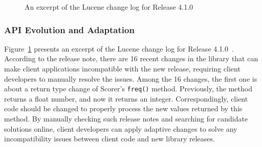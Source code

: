 \documentclass[runningheads,a4paper]{llncs}
\newcommand{\codefont}[1]{\footnotesize{\texttt{#1}}\normalsize}
\begin{document}
\begin{figure}
\centering
{}
\caption{An excerpt of the Lucene change log for Release 4.1.0~\cite{releasenote}}
\label{fig:releasenote}
\end{figure}

\subsubsection{API Evolution and Adaptation} 
\todo{} 
Figure~\ref{fig:releasenote} presents an excerpt of the Lucene change log for Release 4.1.0~\cite{releasenote}. According to the release note, there are 16 recent changes in the library that can make client applications incompatible with the new release, requiring client developers to manually resolve the issues. Among the 16 changes, the first one is about a return type change of Scorer's \codefont{freq()} method. Previously, the method returns a float number, and now it returns an integer. Correspondingly, client code should be changed to properly process the new values returned by this method. By manually checking such release notes and searching for candidate solutions online, client developers can apply adaptive changes to solve any incompatibility issues between client code and new library releases.
\end{document}

